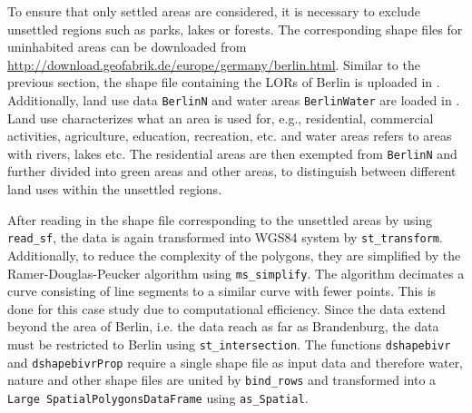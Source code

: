 To ensure that only settled areas are considered, it is necessary to exclude unsettled regions such as parks, lakes or forests. The corresponding shape files for uninhabited areas can be downloaded from \url{http://download.geofabrik.de/europe/germany/berlin.html}. Similar to the previous section, the shape file containing the LORs of Berlin is uploaded in . Additionally, land use data \texttt{BerlinN} and water areas \texttt{BerlinWater} are loaded in . Land use characterizes what an area is used for, e.g., residential, commercial activities, agriculture, education, recreation, etc. and water areas refers to areas with rivers, lakes etc. The residential areas are then exempted from \texttt{BerlinN} and further divided into green areas and other areas, to distinguish between different land uses within the unsettled regions.  

After reading in the shape file corresponding to the unsettled areas by using \texttt{read\_sf}, the data is again transformed into WGS84 system by \texttt{st\_transform}. Additionally, to reduce the complexity of the polygons, they are simplified by the Ramer-Douglas-Peucker algorithm using \texttt{ms\_simplify}. The algorithm decimates a curve consisting of line segments to a similar curve with fewer points. This is done for this case study due to computational efficiency. Since the data extend beyond the area of Berlin, i.e. the data reach as far as Brandenburg, the data must be restricted to Berlin using \texttt{st\_intersection}. 
The functions \texttt{dshapebivr} and \texttt{dshapebivrProp} require a single shape file as input data and therefore water, nature and other shape files are united by \texttt{bind\_rows} and transformed into a \texttt{Large SpatialPolygonsDataFrame} using \texttt{as\_Spatial}.

